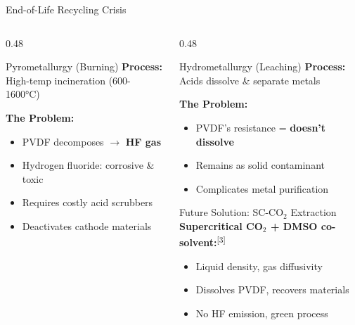 \documentclass[aspectratio=169]{beamer}
\begin{document}
\begin{frame}{End-of-Life Recycling Crisis}
    \begin{columns}[T]
        \begin{column}{0.48\textwidth}
            \begin{alertblock}{Pyrometallurgy (Burning)}
                \small \textbf{Process:} High-temp incineration (600-1600\si{\celsius})
                
                \vspace{0.1cm}
                \textbf{The Problem:}
                \begin{itemize}\small
                    \item PVDF decomposes $\rightarrow$ \textbf{HF gas}
                    \item Hydrogen fluoride: corrosive \& toxic
                    \item Requires costly acid scrubbers
                    \item Deactivates cathode materials
                \end{itemize}
            \end{alertblock}
        \end{column}
        
        \begin{column}{0.48\textwidth}
            \begin{block}{Hydrometallurgy (Leaching)}
                \small \textbf{Process:} Acids dissolve \& separate metals
                
                \vspace{0.1cm}
                \textbf{The Problem:}
                \begin{itemize}\small
                    \item PVDF's resistance = \textbf{doesn't dissolve}
                    \item Remains as solid contaminant
                    \item Complicates metal purification
                \end{itemize}
            \end{block}
            
            \begin{exampleblock}{Future Solution: SC-CO$_2$ Extraction}
                \footnotesize \textbf{Supercritical CO$_2$ + DMSO co-solvent:}\textsuperscript{[3]}
                \begin{itemize}\footnotesize
                    \item Liquid density, gas diffusivity
                    \item Dissolves PVDF, recovers materials
                    \item No HF emission, green process
                \end{itemize}
            \end{exampleblock}
        \end{column}
    \end{columns}
\end{frame}
\end{document}
